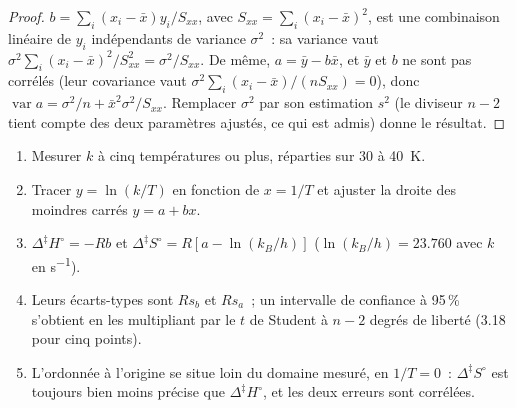 \begin{proof}
$b = \sum_i(x_i - \bar x)y_i/S_{xx}$, avec $S_{xx} = \sum_i(x_i - \bar x)^2$, est une combinaison linéaire de
$y_i$ indépendants de variance $\sigma^2$~: sa variance vaut $\sigma^2\sum_i(x_i - \bar x)^2/S_{xx}^2 = \sigma^2/S_{xx}$.
De même, $a = \bar y - b\bar x$, et $\bar y$ et $b$ ne sont pas corrélés
(leur covariance vaut
$\sigma^2\sum_i(x_i - \bar x)/(nS_{xx}) = 0$), donc $\operatorname{var}a = \sigma^2/n + \bar x^2\sigma^2/S_{xx}$.
Remplacer $\sigma^2$
par son estimation $s^2$ (le diviseur $n - 2$ tient compte des deux
paramètres ajustés, ce qui est admis) donne le résultat.
\end{proof}

\begin{method}\label{met:b3:rate-theories:eyring-plot}
\begin{enumerate}
  \item Mesurer $k$ à cinq températures ou plus, réparties sur 30 à
        \qty{40}{K}.
  \item Tracer $y = \ln(k/T)$ en fonction de $x = 1/T$ et ajuster la
        droite des moindres carrés $y = a + bx$.
  \item $\Delta^{\ddagger}H^\circ = -Rb$ et $\Delta^{\ddagger}S^\circ = R[a - \ln(k_B/h)]$ ($\ln(k_B/h) = 23.760$ avec $k$ en
        \unit{s^{-1}}).
  \item Leurs écarts-types sont $Rs_b$ et $Rs_a$~; un intervalle de
        confiance à 95\,\% s'obtient en les multipliant par le $t$ de
        Student à $n - 2$ degrés de liberté (3.18 pour
        cinq points).
  \item L'ordonnée à l'origine se situe loin du domaine mesuré, en
        $1/T = 0$~: $\Delta^{\ddagger}S^\circ$
        est toujours bien moins précise que $\Delta^{\ddagger}H^\circ$, et
        les deux erreurs sont corrélées.
\end{enumerate}
\end{method}

